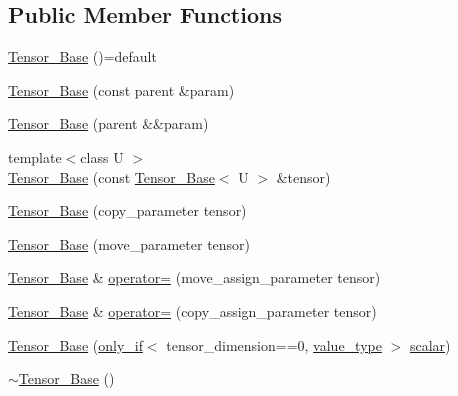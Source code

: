 \subsection*{Public Member Functions}
\begin{DoxyCompactItemize}
\item 
\hyperlink{classBC_1_1tensors_1_1Tensor__Base_af7a47884d93412c7ad3373c62671b537}{Tensor\+\_\+\+Base} ()=default
\item 
\hyperlink{classBC_1_1tensors_1_1Tensor__Base_a0de00e74caf08ebbc402de0509b6f1c2}{Tensor\+\_\+\+Base} (const parent \&param)
\item 
\hyperlink{classBC_1_1tensors_1_1Tensor__Base_a13762703b1ee366751b448ef2ca11c49}{Tensor\+\_\+\+Base} (parent \&\&param)
\item 
{\footnotesize template$<$class U $>$ }\\\hyperlink{classBC_1_1tensors_1_1Tensor__Base_ab1a00b8aea67e313ed3c67c7f3e6daba}{Tensor\+\_\+\+Base} (const \hyperlink{classBC_1_1tensors_1_1Tensor__Base}{Tensor\+\_\+\+Base}$<$ U $>$ \&tensor)
\item 
\hyperlink{classBC_1_1tensors_1_1Tensor__Base_afff64cc97239dbe5fddd37a1bba9edc2}{Tensor\+\_\+\+Base} (copy\+\_\+parameter tensor)
\item 
\hyperlink{classBC_1_1tensors_1_1Tensor__Base_ac523b084e6af2e9e90ae86030a2016ee}{Tensor\+\_\+\+Base} (move\+\_\+parameter tensor)
\item 
\hyperlink{classBC_1_1tensors_1_1Tensor__Base}{Tensor\+\_\+\+Base} \& \hyperlink{classBC_1_1tensors_1_1Tensor__Base_ac0c04ce6b47f6edeaa36628083ea9efb}{operator=} (move\+\_\+assign\+\_\+parameter tensor)
\item 
\hyperlink{classBC_1_1tensors_1_1Tensor__Base}{Tensor\+\_\+\+Base} \& \hyperlink{classBC_1_1tensors_1_1Tensor__Base_a21f3c501bb41dd8bff09446d2b4966e9}{operator=} (copy\+\_\+assign\+\_\+parameter tensor)
\item 
\hyperlink{classBC_1_1tensors_1_1Tensor__Base_a44db8fdf764445bb5c3e0d5cd07883a5}{Tensor\+\_\+\+Base} (\hyperlink{namespaceBC_1_1meta_afed7f4daa1d160f98e989138722fd031}{only\+\_\+if}$<$ tensor\+\_\+dimension==0, \hyperlink{classBC_1_1tensors_1_1Tensor__Base_ae87e17ad59d882fd58df3f010e3712f5}{value\+\_\+type} $>$ \hyperlink{structBC_1_1tensors_1_1Tensor__Utility_a77d35af590f103f5d512ade9bf2be6c9}{scalar})
\item 
\hyperlink{classBC_1_1tensors_1_1Tensor__Base_a3e2fde193b9ed10eebd1f53eadd41f89}{$\sim$\+Tensor\+\_\+\+Base} ()
\end{DoxyCompactItemize}
